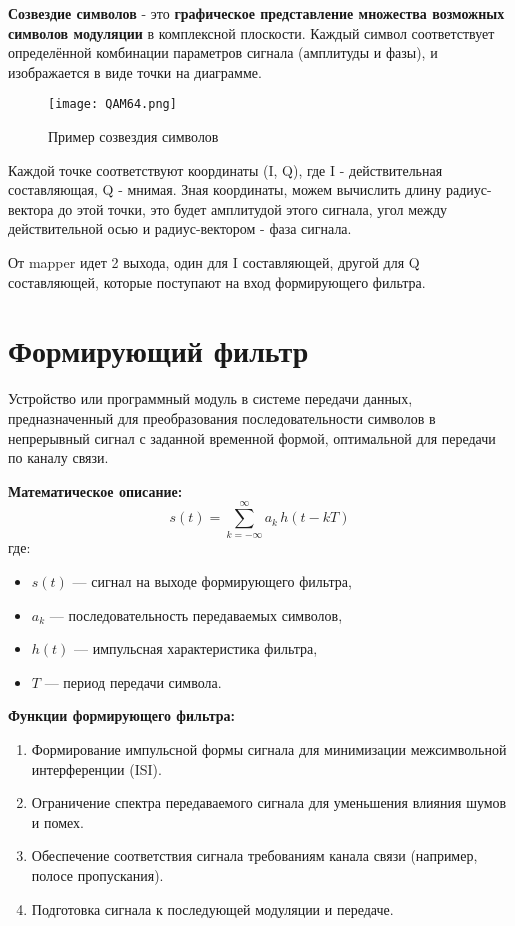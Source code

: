 \textbf{Созвездие символов} - это \textbf{графическое представление множества возможных символов модуляции} в комплексной плоскости.  
Каждый символ соответствует определённой комбинации параметров сигнала (амплитуды и фазы), и изображается в виде точки на диаграмме.  

\begin{figure}[H]
    \centering
    \texttt{[image: QAM64.png]}
    \caption{Пример созвездия символов}
\end{figure}

Каждой точке соответствуют координаты (I, Q), где I - действительная составляющая, Q - мнимая. Зная координаты, можем вычислить
длину радиус-вектора до этой точки, это будет амплитудой этого сигнала, угол между действительной осью и радиус-вектором - фаза
сигнала.

От mapper идет 2 выхода, один для I составляющей, другой для Q составляющей, которые поступают на вход формирующего фильтра.

\section*{Формирующий фильтр}


Устройство или программный модуль в системе передачи данных, предназначенный для преобразования последовательности символов в непрерывный сигнал с заданной временной формой, оптимальной для передачи по каналу связи.  

\textbf{Математическое описание:}
\[
s(t) = \sum_{k=-\infty}^{\infty} a_k \, h(t - kT)
\]
где:
\begin{itemize}
    \item $s(t)$ --- сигнал на выходе формирующего фильтра,
    \item $a_k$ --- последовательность передаваемых символов,
    \item $h(t)$ --- импульсная характеристика фильтра,
    \item $T$ --- период передачи символа.
\end{itemize}

\textbf{Функции формирующего фильтра:}
\begin{enumerate}
    \item Формирование импульсной формы сигнала для минимизации межсимвольной интерференции (ISI).
    \item Ограничение спектра передаваемого сигнала для уменьшения влияния шумов и помех.
    \item Обеспечение соответствия сигнала требованиям канала связи (например, полосе пропускания).
    \item Подготовка сигнала к последующей модуляции и передаче.
\end{enumerate}

